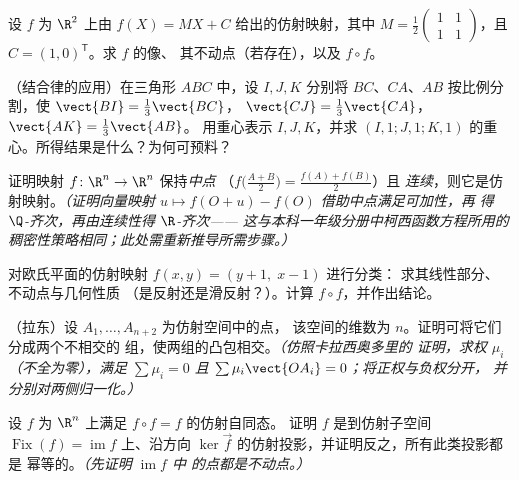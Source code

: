 \begin{exercise}[$\star$]\label{exo:b2:affine:3}
设 $f$ 为 $\R^2$ 上由 $f(X) = MX + C$ 给出的仿射映射，其中
$M = \frac12\begin{pmatrix} 1 & 1\\ 1 & 1\end{pmatrix}$，且 $C =
(1, 0)^{\mathsf T}$。求 $f$ 的像、
其不动点（若存在），以及 $f \circ f$。
\end{exercise}

\begin{exercise}[$\star\star$]\label{exo:b2:affine:4}
（结合律的应用）在三角形 $ABC$ 中，设 $I, J, K$ 分别将
$BC$、$CA$、$AB$ 按比例分割，使 $\vect{BI} = \frac13\vect{BC}$，
$\vect{CJ} = \frac13\vect{CA}$，$\vect{AK} = \frac13\vect{AB}$。
用重心表示 $I, J, K$，并求
$(I,1;J,1;K,1)$ 的重心。所得结果是什么？为何可预料？
\end{exercise}

\begin{exercise}[$\star\star$]\label{exo:b2:affine:5}
证明映射 $f \colon \R^n \to \R^n$ 保持\emph{中点}
（$f\bigl(\frac{A+B}{2}\bigr) = \frac{f(A) + f(B)}{2}$）且
\emph{连续}，则它是仿射映射。\emph{（证明向量映射 $u \mapsto
f(O + u) - f(O)$ 借助中点满足可加性，再
得 $\Q$-齐次，再由连续性得 $\R$-齐次——
这与本科一年级分册中柯西函数方程所用的
稠密性策略相同；此处需重新推导所需步骤。）}
\end{exercise}

\begin{exercise}[$\star\star$]\label{exo:b2:affine:6}
对欧氏平面的仿射映射 $f(x, y) = (y + 1,\; x - 1)$ 进行分类：
求其线性部分、不动点与几何性质
（是反射还是滑反射？）。计算 $f \circ f$，并作出结论。
\end{exercise}

\begin{exercise}[$\star\star\star$]\label{exo:b2:affine:7}
（拉东）设 $A_1, \dots, A_{n+2}$ 为仿射空间中的点，
该空间的维数为 $n$。证明可将它们分成两个不相交的
组，使两组的凸包相交。\emph{（仿照卡拉西奥多里的
证明，求权 $\mu_i$（不全为零），满足 $\sum\mu_i = 0$ 且
$\sum\mu_i\vect{OA_i} = 0$；将正权与负权分开，
并分别对两侧归一化。）}
\end{exercise}

\begin{exercise}[$\star\star\star$]\label{exo:b2:affine:8}
设 $f$ 为 $\R^n$ 上满足 $f \circ f = f$ 的仿射自同态。
证明 $f$ 是到仿射子空间
$\operatorname{Fix}(f) = \operatorname{im} f$ 上、沿方向
$\ker\vec f$ 的仿射投影，并证明反之，所有此类投影都是
幂等的。\emph{（先证明 $\operatorname{im} f$ 中
的点都是不动点。）}
\end{exercise}

